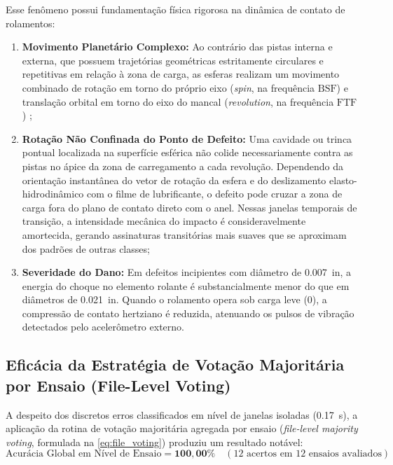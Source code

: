 Esse fenômeno possui fundamentação física rigorosa na dinâmica de contato de rolamentos:
\begin{enumerate}
    \item \textbf{Movimento Planetário Complexo:} Ao contrário das pistas interna e externa, que possuem trajetórias geométricas estritamente circulares e repetitivas em relação à zona de carga, as esferas realizam um movimento combinado de rotação em torno do próprio eixo (\textit{spin}, na frequência $\text{BSF}$) e translação orbital em torno do eixo do mancal (\textit{revolution}, na frequência $\text{FTF}$) \cite{harris2006rolling};
    \item \textbf{Rotação Não Confinada do Ponto de Defeito:} Uma cavidade ou trinca pontual localizada na superfície esférica não colide necessariamente contra as pistas no ápice da zona de carregamento a cada revolução. Dependendo da orientação instantânea do vetor de rotação da esfera e do deslizamento elasto-hidrodinâmico com o filme de lubrificante, o defeito pode cruzar a zona de carga fora do plano de contato direto com o anel. Nessas janelas temporais de transição, a intensidade mecânica do impacto é consideravelmente amortecida, gerando assinaturas transitórias mais suaves que se aproximam dos padrões de outras classes;
    \item \textbf{Severidade do Dano:} Em defeitos incipientes com diâmetro de \SI{0.007}{in}, a energia do choque no elemento rolante é substancialmente menor do que em diâmetros de \SI{0.021}{in}. Quando o rolamento opera sob carga leve (\SI{0}{\horsepower}), a compressão de contato hertziano é reduzida, atenuando os pulsos de vibração detectados pelo acelerômetro externo.
\end{enumerate}

\subsection{Eficácia da Estratégia de Votação Majoritária por Ensaio (File-Level Voting)}
A despeito dos discretos erros classificados em nível de janelas isoladas (\SI{0,17}{\second}), a aplicação da rotina de votação majoritária agregada por ensaio (\textit{file-level majority voting}, formulada na \autoref{eq:file_voting}) produziu um resultado notável:
\begin{equation}
    \text{Acurácia Global em Nível de Ensaio} = \mathbf{100,00\%} \quad (\num{12} \text{ acertos em } \num{12} \text{ ensaios avaliados})
    \label{eq:resultado_votacao}
\end{equation}

